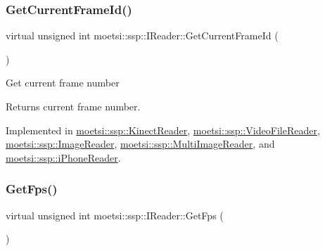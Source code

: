 \mbox{\label{classmoetsi_1_1ssp_1_1IReader_ac292d83eb06dee277baaa06e281a562d}} 
\subsubsection{\texorpdfstring{Get\+Current\+Frame\+Id()}{GetCurrentFrameId()}}
{\footnotesize\ttfamily virtual unsigned int moetsi\+::ssp\+::\+I\+Reader\+::\+Get\+Current\+Frame\+Id (\begin{DoxyParamCaption}{ }\end{DoxyParamCaption})\hspace{0.3cm}{\ttfamily [pure virtual]}}

Get current frame number \begin{DoxyReturn}{Returns}
current frame number. 
\end{DoxyReturn}


Implemented in \hyperlink{classmoetsi_1_1ssp_1_1KinectReader_aa17e268723c41bdad5082575decb28eb}{moetsi\+::ssp\+::\+Kinect\+Reader}, \hyperlink{classmoetsi_1_1ssp_1_1VideoFileReader_aef5c92da2645cddc7e4ffcfd34ad4b8a}{moetsi\+::ssp\+::\+Video\+File\+Reader}, \hyperlink{classmoetsi_1_1ssp_1_1ImageReader_a386125736df9f25e5c4312bb679ff031}{moetsi\+::ssp\+::\+Image\+Reader}, \hyperlink{classmoetsi_1_1ssp_1_1MultiImageReader_a994eea20e9682c2f4afc9303a34c76f3}{moetsi\+::ssp\+::\+Multi\+Image\+Reader}, and \hyperlink{classmoetsi_1_1ssp_1_1iPhoneReader_a78792c6319743aed3ef2afc96fe16485}{moetsi\+::ssp\+::i\+Phone\+Reader}.

\mbox{\label{classmoetsi_1_1ssp_1_1IReader_a9f6a8650ca290b011b8e5451eeae9f32}} 
\subsubsection{\texorpdfstring{Get\+Fps()}{GetFps()}}
{\footnotesize\ttfamily virtual unsigned int moetsi\+::ssp\+::\+I\+Reader\+::\+Get\+Fps (\begin{DoxyParamCaption}{ }\end{DoxyParamCaption})\hspace{0.3cm}{\ttfamily [pure virtual]}}

